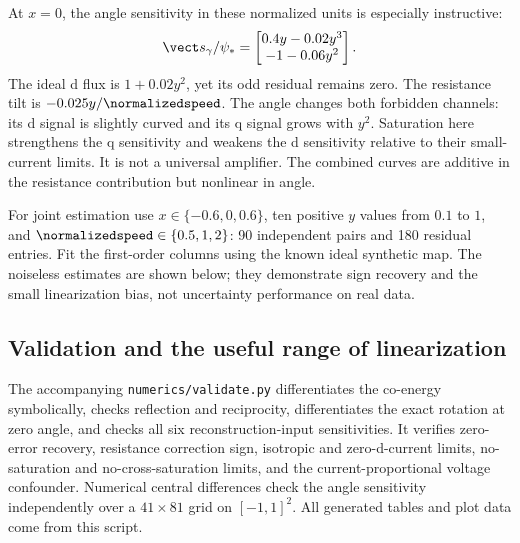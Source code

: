 At $x=0$, the angle sensitivity in these normalized units is especially
instructive:
\begin{equation}
 \vect s_\gamma/\psi_*=
 \begin{bmatrix}0.4y-0.02y^3\\-1-0.06y^2\end{bmatrix}.
\end{equation}
The ideal d flux is $1+0.02y^2$, yet its odd residual remains zero.
The resistance tilt is $-0.025y/\normalizedspeed$. The angle changes both forbidden
channels: its d signal is slightly curved and its q signal grows with
$y^2$. Saturation here strengthens the q sensitivity and weakens the d
sensitivity relative to their small-current limits. It is not a universal
amplifier. The combined curves are additive in the resistance contribution
but nonlinear in angle.

For joint estimation use $x\in\{-0.6,0,0.6\}$, ten positive $y$ values
from $0.1$ to $1$, and $\normalizedspeed\in\{0.5,1,2\}$: 90 independent pairs and 180
residual entries. Fit the first-order columns using the known ideal synthetic
map. The noiseless estimates are shown below; they demonstrate sign recovery
and the small linearization bias, not uncertainty performance on real data.
\begin{table}[tb]
\centering\small
\caption{First-order estimation from exact synthetic voltage reconstruction.
The nonzero injected values are $0.025$ ohm and $0.02$ rad. RMS is the
post-fit residual per scalar entry, normalized by $\psi_*$.}
\label{tab:estimates}
\end{table}

\subsection{Validation and the useful range of linearization}
The accompanying \texttt{numerics/validate.py} differentiates the co-energy
symbolically, checks reflection and reciprocity, differentiates the exact
rotation at zero angle, and checks all six reconstruction-input sensitivities.
It verifies zero-error recovery, resistance correction sign, isotropic and
zero-d-current limits, no-saturation and no-cross-saturation limits, and the
current-proportional voltage confounder. Numerical central differences check
the angle sensitivity independently over a $41\times81$ grid on $[-1,1]^2$.
All generated tables and plot data come from this script.

